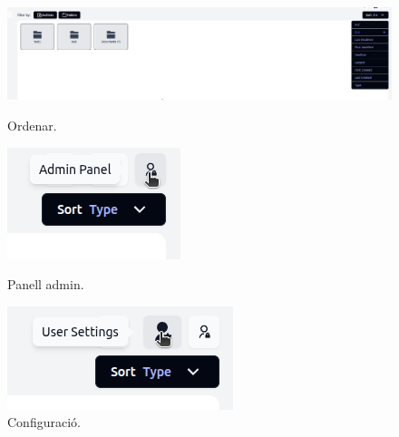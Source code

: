 \begin{figure}[H]
    \centering
    \begin{minipage}{0.24\textwidth}
        \centering
        \includegraphics[width=\linewidth]{Figures/ui-web/sort_options.png}
        \caption{Ordenar.}
    \end{minipage}\hfill
    \begin{minipage}{0.24\textwidth}
        \centering
        \includegraphics[width=\linewidth]{Figures/ui-web/admin_panel_button.png}
        \caption{Panell admin.}
    \end{minipage}\hfill
    \begin{minipage}{0.24\textwidth}
        \centering
        \includegraphics[width=\linewidth]{Figures/ui-web/user_settings_button.png}
        \caption{Configuració.}
    \end{minipage}\hfill

\end{figure}
